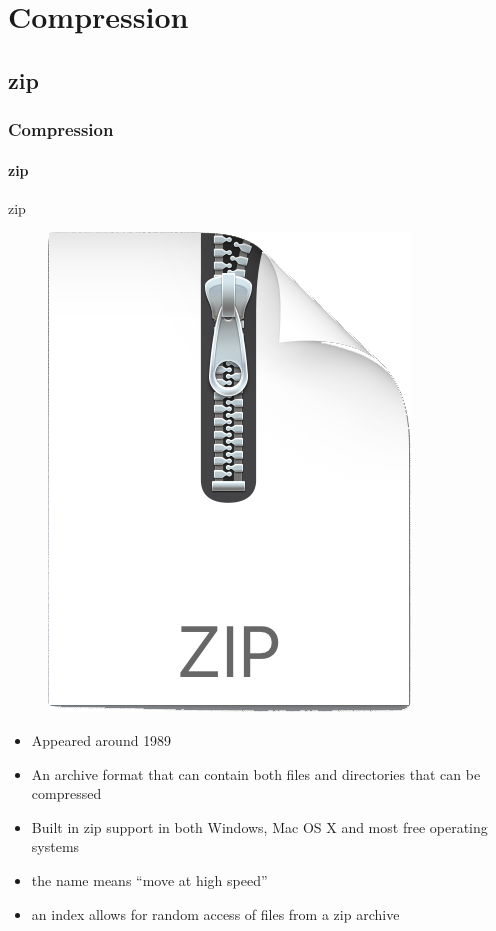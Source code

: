 \documentclass[aspectratio=169,usenames,dvipsnames]{beamer}
\begin{document}
\section{Compression}
    \subsection{zip}

    \begin{frame}
        \frametitle{Compression}
        \framesubtitle{zip}
        \begin{block}{zip}
        \begin{figure}
        \centering
        \vspace{-6pt}
        \includegraphics[width=0.55\linewidth]{Figures/zip.png}
        \end{figure}
            \mbox{}
            \begin{itemize}
                \item Appeared around \alert{1989}
                \item An archive format that \alert{can contain both files and directories} that \alert{can be compressed}
            \end{itemize}
            \mbox{}\vspace{-20pt}
            \begin{itemize}
                \item Built in zip support in both Windows, Mac OS X and most free operating systems
                \item the name means ``move at high speed''
                \item an index allows for \alert{random access} of files from a zip archive
            \end{itemize}

        \end{block}
    \end{frame}
\end{document}
